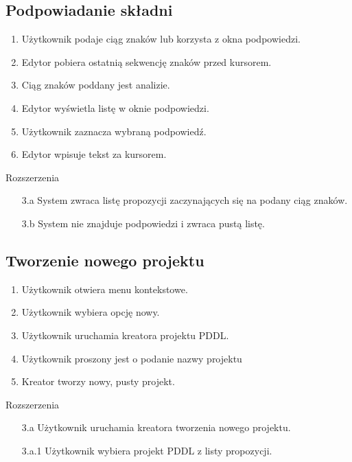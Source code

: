 \subsection{Podpowiadanie składni}
\label{reqAutocompletion}
\begin{enumerate}
\item Użytkownik podaje ciąg znaków lub korzysta z okna podpowiedzi.
\item Edytor pobiera ostatnią sekwencję znaków przed kursorem.
\item Ciąg znaków poddany jest analizie.
\item Edytor wyświetla listę w oknie podpowiedzi.
\item Użytkownik zaznacza wybraną podpowiedź.
\item Edytor wpisuje tekst za kursorem.
\end{enumerate}
Rozszerzenia
\begin{enumerate}
\item[3.a] System zwraca listę propozycji zaczynających się na podany ciąg znaków.
\item[3.b] System nie znajduje podpowiedzi i zwraca pustą listę.
\end{enumerate}
\subsection{Tworzenie nowego projektu}
\begin{enumerate}
\item Użytkownik otwiera menu kontekstowe.
\item Użytkownik wybiera opcję nowy.
\item Użytkownik uruchamia kreatora projektu PDDL.
\item Użytkownik proszony jest o podanie nazwy projektu
\item Kreator tworzy nowy, pusty projekt.
\end{enumerate}
Rozszerzenia
\begin{enumerate}
\item[3.a] Użytkownik uruchamia kreatora tworzenia nowego projektu. 
\item[3.a.1] Użytkownik wybiera projekt PDDL z listy propozycji.
\end{enumerate}
